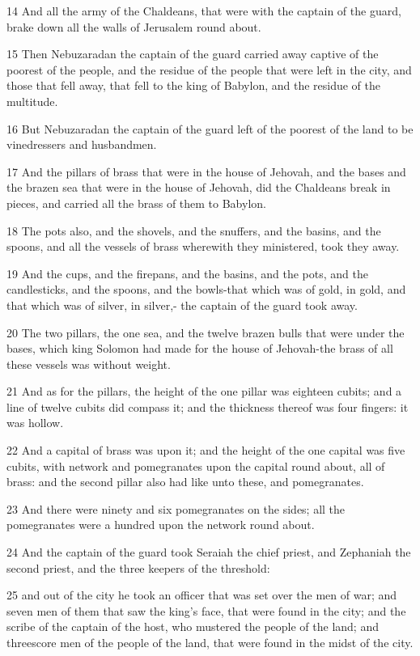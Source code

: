 \par 14 And all the army of the Chaldeans, that were with the captain of the guard, brake down all the walls of Jerusalem round about.
\par 15 Then Nebuzaradan the captain of the guard carried away captive of the poorest of the people, and the residue of the people that were left in the city, and those that fell away, that fell to the king of Babylon, and the residue of the multitude.
\par 16 But Nebuzaradan the captain of the guard left of the poorest of the land to be vinedressers and husbandmen.
\par 17 And the pillars of brass that were in the house of Jehovah, and the bases and the brazen sea that were in the house of Jehovah, did the Chaldeans break in pieces, and carried all the brass of them to Babylon.
\par 18 The pots also, and the shovels, and the snuffers, and the basins, and the spoons, and all the vessels of brass wherewith they ministered, took they away.
\par 19 And the cups, and the firepans, and the basins, and the pots, and the candlesticks, and the spoons, and the bowls-that which was of gold, in gold, and that which was of silver, in silver,- the captain of the guard took away.
\par 20 The two pillars, the one sea, and the twelve brazen bulls that were under the bases, which king Solomon had made for the house of Jehovah-the brass of all these vessels was without weight.
\par 21 And as for the pillars, the height of the one pillar was eighteen cubits; and a line of twelve cubits did compass it; and the thickness thereof was four fingers: it was hollow.
\par 22 And a capital of brass was upon it; and the height of the one capital was five cubits, with network and pomegranates upon the capital round about, all of brass: and the second pillar also had like unto these, and pomegranates.
\par 23 And there were ninety and six pomegranates on the sides; all the pomegranates were a hundred upon the network round about.
\par 24 And the captain of the guard took Seraiah the chief priest, and Zephaniah the second priest, and the three keepers of the threshold:
\par 25 and out of the city he took an officer that was set over the men of war; and seven men of them that saw the king's face, that were found in the city; and the scribe of the captain of the host, who mustered the people of the land; and threescore men of the people of the land, that were found in the midst of the city.
